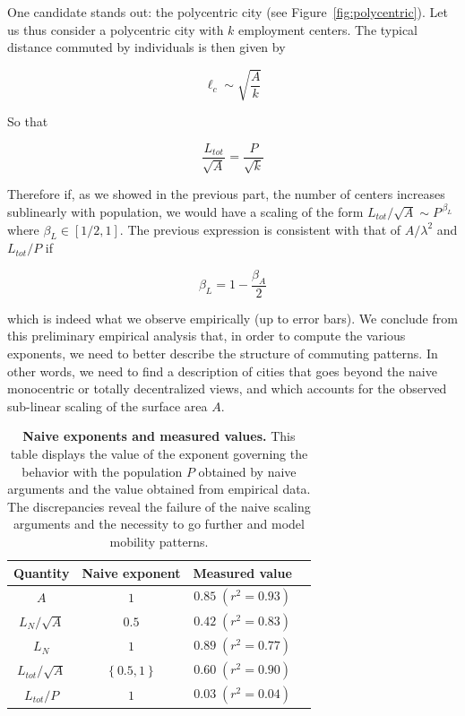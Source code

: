 One candidate stands out: the polycentric city (see
Figure~\ref{fig:polycentric}). Let us thus consider a polycentric city with $k$
employment centers. The typical distance commuted by individuals is then given by

\begin{equation}
    \ell_c \sim \sqrt{\frac{A}{k}}
\end{equation}

So that

\begin{equation}
    \frac{L_{tot}}{\sqrt{A}} = \frac{P}{\sqrt{k}}
\end{equation}

Therefore if, as we showed in the previous part,  the number of centers
increases sublinearly with population, we would have a scaling of the form
$L_{tot}/\sqrt{A}\sim P^{\,\beta_L}$ where $\beta_L \in [1/2,1]$. The previous
expression is consistent with that of $A/\lambda^2$ and $L_{tot}/P$ if

\begin{equation} 
    \beta_L = 1-\frac{\beta_A}{2} 
    \label{eq:consis} 
\end{equation}

which is indeed what we observe empirically (up to error bars). We conclude from
this preliminary empirical analysis that, in order to compute the various
exponents, we need to better describe the structure of commuting patterns. In
other words, we need to find a description of cities that goes beyond the naive
monocentric or totally decentralized views, and which accounts for the observed
sub-linear scaling of the surface area $A$.



\begin{table}[!h]
    \centering
\begin{tabular}{|c|c|c|l|}
\hline
Quantity & Naive exponent &  Measured value\\
\hline
$A $ & $1$ & $0.85\; (r^2=0.93)$\\
\hline
$L_N / \sqrt{A}$ & $0.5$ & $0.42\; (r^2=0.83)$\\
$L_N $ & $1$ & $0.89\;(r^2=0.77)$\\ 
\hline
$L_{tot} / \sqrt{A}$ &  $\left\{0.5,1\right\}$ & $0.60\; (r^2=0.90)$\\
$L_{tot} /P$ &  $1$ & $0.03\; (r^2=0.04)$\\
\hline
\end{tabular}
\caption{{\bf Naive exponents and measured values.} This table displays the value of the exponent governing the behavior with the population $P$ obtained by naive arguments and the value obtained from empirical data. The discrepancies reveal the failure of the naive scaling arguments and the necessity to go further and model mobility patterns.}
\label{table:naive}
\end{table}



